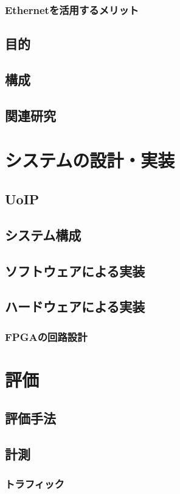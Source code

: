 \subsection{Ethernetを活用するメリット}
\section{目的}
\section{構成}
\section{関連研究}

\chapter{システムの設計・実装}
\section{UoIP} %
\section{システム構成}
\section{ソフトウェアによる実装}
\section{ハードウェアによる実装}
\subsection{FPGAの回路設計}

\chapter{評価}
\section{評価手法}
\section{計測}
\subsection{トラフィック}
